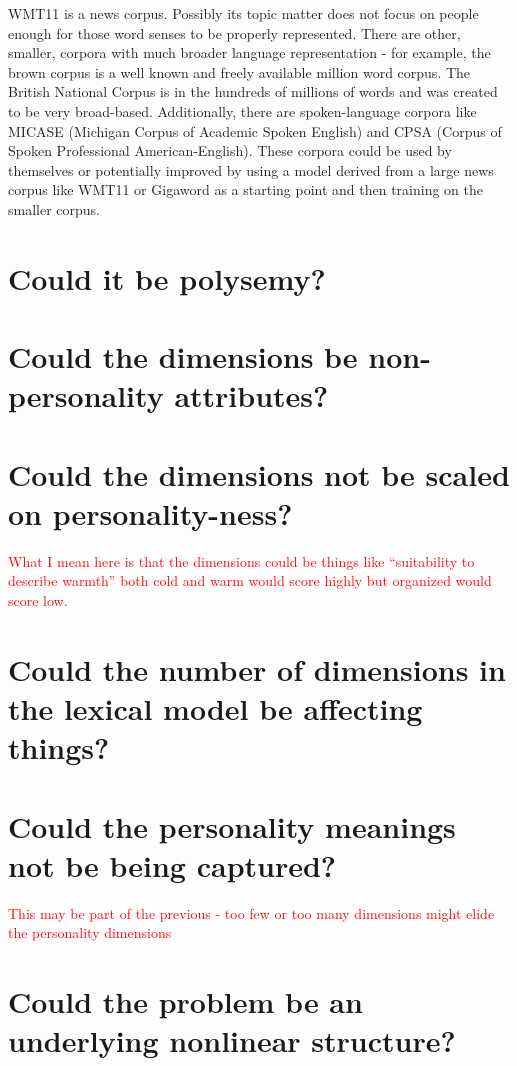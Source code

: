\documentclass[10pt,letterpaper]{book}
\newcommand{\todo}[1]{\textcolor{red}{#1}}
\begin{document}
WMT11 is a news corpus. Possibly its topic matter does not focus on people enough for those word senses to be properly represented. There are other, smaller, corpora with much broader language representation - for example, the brown corpus is a well known and freely available million word corpus. The British National Corpus is in the hundreds of millions of words and was created to be very broad-based. Additionally, there are spoken-language corpora like MICASE (Michigan Corpus of Academic Spoken English) and CPSA (Corpus of Spoken Professional American-English). These corpora could be used by themselves or potentially improved by using a model derived from a large news corpus like WMT11 or Gigaword as a starting point and then training on the smaller corpus.

\section{Could it be polysemy?}

\section{Could the dimensions be non-personality attributes?}
\section{Could the dimensions not be scaled on personality-ness?}

\todo{What I mean here is that the dimensions could be things like ``suitability to describe warmth'' both cold and warm would score highly but organized would score low.}

\section{Could the number of dimensions in the lexical model be affecting things?}

\section{Could the personality meanings not be being captured?}

\todo{This may be part of the previous - too few or too many dimensions might elide the personality dimensions}

\section{Could the problem be an underlying nonlinear structure?}
\end{document}
